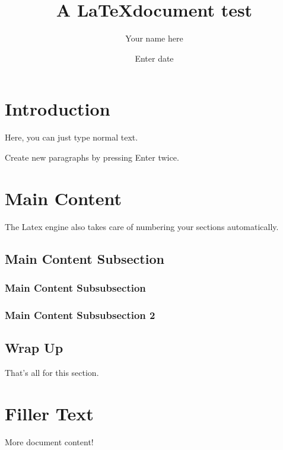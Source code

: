 \documentclass[11pt,letterpaper]{article}
\author{Your name here}
\date{Enter date}
\title{A \LaTeX document test}
\begin{document}
\maketitle 
\newpage

\tableofcontents
\newpage

\section{Introduction}
Here, you can just type normal text.

Create new paragraphs by pressing Enter twice.
\newpage

\section{Main Content}
The Latex engine also takes care of numbering your sections automatically. 

    \subsection{Main Content Subsection}

        \subsubsection{Main Content Subsubsection}

        \subsubsection{Main Content Subsubsection 2}
        
    \subsection{Wrap Up}
    That's all for this section.


\section{Filler Text}
More document content!
\end{document}
